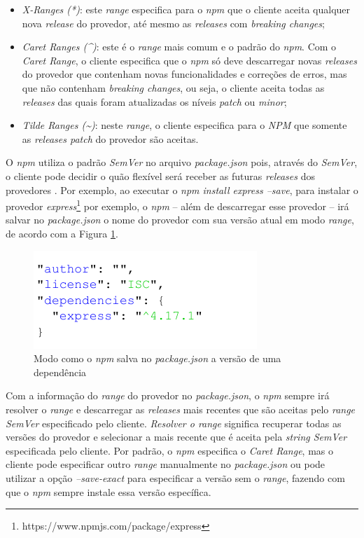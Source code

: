 \begin{itemize}
    \item \textit{X-Ranges (*)}: este \textit{range} especifica para o \textit{npm} que o cliente aceita qualquer nova \textit{release} do provedor, até mesmo as \textit{releases} com \textit{breaking changes};
    \item \textit{Caret Ranges (\textasciicircum)}: este é o \textit{range} mais comum e o padrão do \textit{npm}. Com o \textit{Caret Range}, o cliente especifica que o \textit{npm} só deve descarregar novas \textit{releases} do provedor que contenham novas funcionalidades e correções de erros, mas que não contenham \textit{breaking changes}, ou seja, o cliente aceita todas as \textit{releases} das quais foram atualizadas os níveis \textit{patch} ou \textit{minor};
    \item \textit{Tilde Ranges (\textasciitilde)}: neste \textit{range}, o cliente especifica para o \textit{NPM} que somente as \textit{releases patch} do provedor são aceitas.
\end{itemize}{}

O \textit{npm} utiliza o padrão \textit{SemVer} no arquivo \textit{package.json} pois, através do \textit{SemVer}, o cliente pode decidir o quão flexível será receber as futuras \textit{releases} dos provedores \cite{decan}. Por exemplo, ao executar o \textit{npm install express --save}, para instalar o provedor \textit{express}\footnote{https://www.npmjs.com/package/express} por exemplo, o \textit{npm} -- além de descarregar esse provedor -- irá salvar no \textit{package.json} o nome do provedor com sua versão atual em modo \textit{range}, de acordo com a Figura \ref{fig:dep_express}.

\begin{figure}
    \centering
    \includegraphics[scale=1.3]{figuras/dependencies_express.pdf}
    \caption{Modo como o \textit{npm} salva no \textit{package.json} a versão de uma dependência}
    \label{fig:dep_express}
\end{figure}{}

Com a informação do \textit{range} do provedor no \textit{package.json}, o \textit{npm} sempre irá resolver o \textit{range} e descarregar as \textit{releases} mais recentes que são aceitas pelo \textit{range SemVer} especificado pelo cliente. \textit{Resolver o range} significa recuperar todas as versões do provedor e selecionar a mais recente que é aceita pela \textit{string SemVer} especificada pelo cliente. Por padrão, o \textit{npm} especifica o \textit{Caret Range}, mas o cliente pode especificar outro \textit{range} manualmente no \textit{package.json} ou pode utilizar a opção \textit{--save-exact} para especificar a versão sem o \textit{range}, fazendo com que o \textit{npm} sempre instale essa versão específica.

